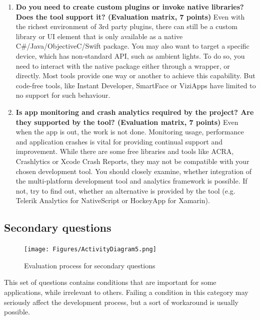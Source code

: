 \documentclass[english,master,public,dept460,male,cpdeclaration,oneside]{diploma}
\begin{document}
\begin{enumerate}
	\item \textbf{Do you need to create custom plugins or invoke native libraries? Does the tool support it? (Evaluation matrix, 7 points) }
	Even with the richest environment of 3rd party plugins, there can still be a custom library or UI element that is only available as a native C\#/Java/ObjectiveC/Swift package. You may also want to target a specific device, which has non-standard API, such as ambient lights. To do so, you need to interact with the native package either through a wrapper, or directly. Most tools provide one way or another to achieve this capability. But code-free tools, like Instant Developer, SmartFace or ViziApps have limited to no support for such behaviour.
	
	\item \textbf{Is app monitoring and crash analytics required by the project? Are they supported by the tool? (Evaluation matrix, 7 points) }
	Even when the app is out, the work is not done. Monitoring usage, performance and application crashes is vital for providing continual support and improvement. While there are some free libraries and tools like ACRA, Crashlytics or Xcode Crash Reports, they may not be compatible with your chosen development tool. You should closely examine, whether integration of the multi-platform development tool and analytics framework is possible. If not, try to find out, whether an alternative is provided by the tool (e.g. Telerik Analytics for NativeScript or HockeyApp for Xamarin).
\end{enumerate}

\subsection{Secondary questions}

\begin{figure}
	\centering\texttt{[image: Figures/ActivityDiagram5.png]}
	\caption{Evaluation process for secondary questions}
\end{figure}

This set of questions contains conditions that are important for some applications, while irrelevant to others. Failing a condition in this category may seriously affect the development process, but a sort of workaround is usually possible.
\end{document}
